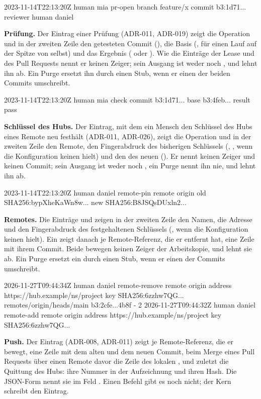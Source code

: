   2023-11-14T22:13:20Z  human mia  pr-open
    branch feature/x  commit b3:1d71...  reviewer human daniel
\stoptyping

{\bf Prüfung.} Der Eintrag einer Prüfung (ADR-011, ADR-019) zeigt die Operation  und
in der zweiten Zeile den getesteten Commit (), die Basis (, \type{-} für
einen Lauf auf der Spitze von  selbst) und das Ergebnis ( oder
).
Wie die Einträge der Lease und des Pull Requests nennt er keinen Zeiger; sein Ausgang ist weder
\type{!} noch , und  lehnt ihn ab.
Ein Purge ersetzt ihn durch einen Stub, wenn er einen der beiden Commits umschreibt.

  2023-11-14T22:13:20Z  human mia  check
    commit b3:1d71...  base b3:4feb...  result pass
\stoptyping

{\bf Schlüssel des Hubs.} Der Eintrag, mit dem ein Mensch den Schlüssel des Hubs eines Remote neu
festhält (ADR-011, ADR-026), zeigt die Operation  und in der zweiten Zeile den
Remote, den Fingerabdruck des bisherigen Schlüssels (, \type{-}, wenn die
Konfiguration keinen hielt) und den des neuen ().
Er nennt keinen Zeiger und keinen Commit; sein Ausgang ist weder \type{!} noch , ein
Purge nennt ihn nie, und  lehnt ihn ab.

  2023-11-14T22:13:20Z  human daniel  remote-pin
    remote origin  old SHA256:bypXheKaWn8w...  new SHA256:B8JSQsDUxln2...
\stoptyping

{\bf Remotes.} Die Einträge  und  zeigen in der zweiten
Zeile den Namen, die Adresse und den Fingerabdruck des festgehaltenen Schlüssels (\type{-},
wenn die Konfiguration keinen hielt).
Ein  zeigt danach je Remote-Referenz, die er entfernt hat, eine Zeile mit
ihrem Commit.
Beide bewegen keinen Zeiger der Arbeitskopie, und  lehnt sie ab.
Ein Purge ersetzt ein  durch einen Stub, wenn er einen der Commits umschreibt.

  2026-11-27T09:44:34Z  human daniel  remote-remove
    remote origin  address https://hub.example/ns/project  key SHA256:6zzhw7QG...
    remotes/origin/heads/main b3:2cfe...4b8f -
2  2026-11-27T09:44:32Z  human daniel  remote-add
    remote origin  address https://hub.example/ns/project  key SHA256:6zzhw7QG...
\stoptyping

{\bf Push.} Der Eintrag  (ADR-008, ADR-011) zeigt je Remote-Referenz, die er bewegt,
eine Zeile mit dem alten und dem neuen Commit, beim Merge eines Pull Requests über einen Remote
davor die Zeile des lokalen , und zuletzt die Quittung des Hubs: ihre Nummer in der
Aufzeichnung und ihren Hash.
Die JSON-Form nennt sie im Feld .
Einen Befehl  gibt es noch nicht; der Kern schreibt den Eintrag.

